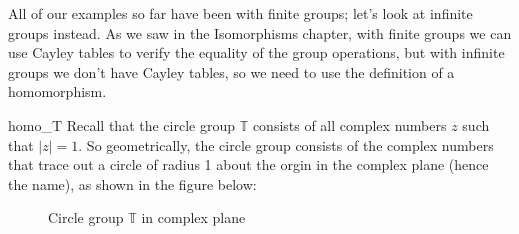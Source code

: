  All of our examples so far have been with finite groups; let's look at infinite groups instead.  As we saw in the Isomorphisms chapter, with finite groups we can use Cayley tables to verify the equality of the group operations, but with infinite groups we don't have  Cayley tables, so we need to use  the definition of a homomorphism.

\begin{example}{homo_T}
Recall that the circle group ${ \mathbb T}$ consists of all complex numbers $z$ such that $|z|=1$. So geometrically, the circle group consists of the complex numbers that trace out a circle of radius 1 about the orgin in the complex plane (hence the name), as shown in the figure below:

\begin{figure}[hbt]
\begin{center}

\end{center}
\caption{Circle group ${ \mathbb T}$ in complex plane}
\label{fig:circleGroup}
\end{figure}


\end{example}
